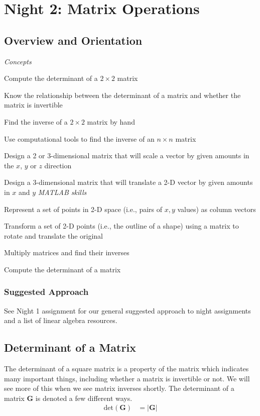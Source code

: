 \chapter{Night 2: Matrix Operations}

\section*{Overview and Orientation}

\begin{learningobjectives}
\emph{Concepts}
\bi
\item Compute the determinant of a $2\times 2$ matrix
\item Know the relationship between the determinant of a matrix and whether the matrix is invertible
\item Find the inverse of a $2 \times 2$ matrix by hand
\item Use computational tools to find the inverse of an $n \times n$ matrix
\item Design a 2 or 3-dimensional matrix that will scale a vector by given amounts in the $x$, $y$ or $z$ direction
\item Design a 3-dimensional matrix that will translate a 2-D vector by given amounts in $x$ and $y$
\ei
\emph{MATLAB skills}
\bi
\item Represent a set of points in 2-D space (i.e., pairs of $x,y$ values) as column vectors
\item Transform a set of 2-D points (i.e., the outline of a shape) using a matrix to rotate and translate the original
\item Multiply matrices and find their inverses
\item Compute the determinant of a matrix
\ei
\end{learningobjectives}

\subsection{Suggested Approach}
See Night 1 assignment for our general suggested approach to night assignments and a list of linear algebra resources.

\section{Determinant of a Matrix}

The determinant of a square matrix is a property of the matrix which indicates many important things, including whether a matrix is invertible or not. We will see more of this when we see matrix inverses shortly. The determinant of a matrix $\mathbf{G}$ is denoted a few different ways.
\begin{align}
\mbox{det}(\mathbf{G}) &= |\mathbf{G}|
\end{align}



